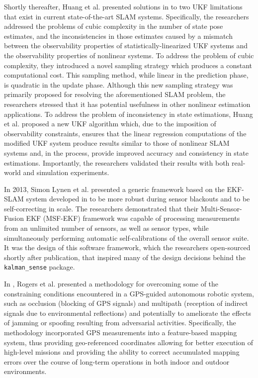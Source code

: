 Shortly thereafter, Huang et al. presented solutions in \cite{Huang2013} to two UKF limitations that exist in current state-of-the-art SLAM systems. Specifically, the researchers addressed the problems of cubic complexity in the number of state pose estimates, and the inconsistencies in those estimates caused by a mismatch between the observability properties of statistically-linearized UKF systems and the observability properties of nonlinear systems. To address the problem of cubic complexity, they introduced a novel sampling strategy which produces a constant computational cost. This sampling method, while linear in the prediction phase, is quadratic in the update phase. Although this new sampling strategy was primarily proposed for resolving the aforementioned SLAM problem, the researchers stressed that it has potential usefulness in other nonlinear estimation applications. To address the problem of inconsistency in state estimations, Huang et al. proposed a new UKF algorithm which, due to the imposition of observability constraints, ensures that the linear regression computations of the modified UKF system produce results similar to those of nonlinear SLAM systems and, in the process, provide improved accuracy and consistency in state estimations. Importantly, the researchers validated their results with both real-world and simulation experiments.

In 2013, Simon Lynen et al. \cite{Lynen2013} presented a generic framework based on the EKF-SLAM system developed in \cite{Weiss2012} to be more robust during sensor blackouts and to be self-correcting in scale. The researchers demonstrated that their Multi-Sensor-Fusion EKF (MSF-EKF) framework was capable of processing measurements from an unlimited number of sensors, as well as sensor types, while simultaneously performing automatic self-calibrations of the overall sensor suite. It was the design of this software framework, which the researchers open-sourced shortly after publication, that inspired many of the design decisions behind the \texttt{kalman\_sense} package.

In \cite{Rogers2014}, Rogers et al. presented a methodology for overcoming some of the constraining conditions encountered in a GPS-guided autonomous robotic system, such as occlusion (blocking of GPS signals) and multipath (reception of indirect signals due to environmental reflections) and potentially to ameliorate the effects of jamming or spoofing resulting from adversarial activities. Specifically, the methodology incorporated GPS measurements into a feature-based mapping system, thus providing geo-referenced coordinates allowing for better execution of high-level missions and providing the ability to correct accumulated mapping errors over the course of long-term operations in both indoor and outdoor environments.

